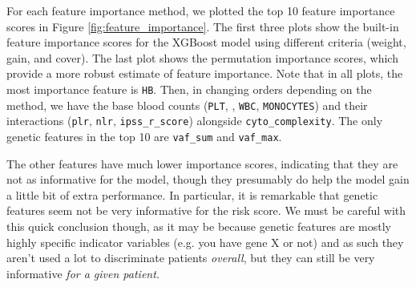 \documentclass{article}
\begin{document}
For each feature importance method, we plotted the top 10 feature importance scores in Figure \ref{fig:feature_importance}. The first three plots show the built-in feature importance scores for the XGBoost model using different criteria (weight, gain, and cover). The last plot shows the permutation importance scores, which provide a more robust estimate of feature importance. Note that in all plots, the most importance feature is \texttt{HB}. Then, in changing orders depending on the method, we have the base blood counts (\texttt{PLT}, , \texttt{WBC}, \texttt{MONOCYTES}) and their interactions (\texttt{plr}, \texttt{nlr}, \texttt{ipss\_r\_score}) alongside \texttt{cyto\_complexity}. The only genetic features in the top 10 are \texttt{vaf\_sum} and \texttt{vaf\_max}.

The other features have much lower importance scores, indicating that they are not as informative for the model, though they presumably do help the model gain a little bit of extra performance. In particular, it is remarkable that genetic features seem not be very informative for the risk score. We must be careful with this quick conclusion though, as it may be because genetic features are mostly highly specific indicator variables (e.g. you have gene X or not) and as such they aren't used a lot to discriminate patients \textit{overall}, but they can still be very informative \textit{for a given patient}.
\end{document}
